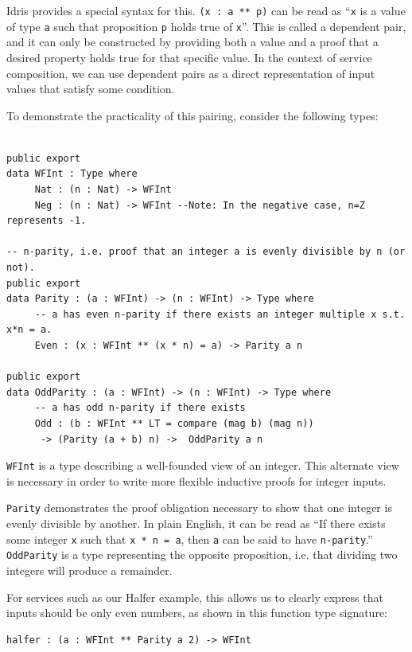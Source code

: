 \documentclass[]{report}
\begin{document}
Idris provides a special syntax for this.
\texttt{(x : a ** p)} can be read as ``\texttt{x} is a value of type \texttt{a} such that
proposition \texttt{p} holds true of \texttt{x}''.  This is called a dependent pair, and it can
only be constructed by providing both a value and a proof that a desired
property holds true for that specific value.  In the context of service
composition, we can use dependent pairs as a direct representation of input
values that satisfy some condition.

To demonstrate the practicality of this pairing, consider the following types:

\begin{verbatim}

public export
data WFInt : Type where
     Nat : (n : Nat) -> WFInt
     Neg : (n : Nat) -> WFInt --Note: In the negative case, n=Z represents -1.

-- n-parity, i.e. proof that an integer a is evenly divisible by n (or not).
public export
data Parity : (a : WFInt) -> (n : WFInt) -> Type where
     -- a has even n-parity if there exists an integer multiple x s.t. x*n = a.
     Even : (x : WFInt ** (x * n) = a) -> Parity a n

public export
data OddParity : (a : WFInt) -> (n : WFInt) -> Type where
     -- a has odd n-parity if there exists
     Odd : (b : WFInt ** LT = compare (mag b) (mag n))
      -> (Parity (a + b) n) ->  OddParity a n

\end{verbatim}

\texttt{WFInt} is a type describing a well-founded view of an integer.  This
alternate view is necessary in order to write more flexible inductive proofs for
integer inputs.

\texttt{Parity} demonstrates the proof obligation necessary to
show that one integer is evenly divisible by another.  In plain English, it can
be read as ``If there exists some integer \texttt{x} such that
\texttt{x * n = a}, then \texttt{a} can be said to have \texttt{n-parity}.''
\texttt{OddParity} is a type representing the opposite proposition, i.e. that
dividing two integers will produce a remainder.

For services such as our Halfer example, this allows us to clearly express that
inputs should be only even numbers, as shown in this function type signature:

\begin{verbatim}
halfer : (a : WFInt ** Parity a 2) -> WFInt
\end{verbatim}
\end{document}
